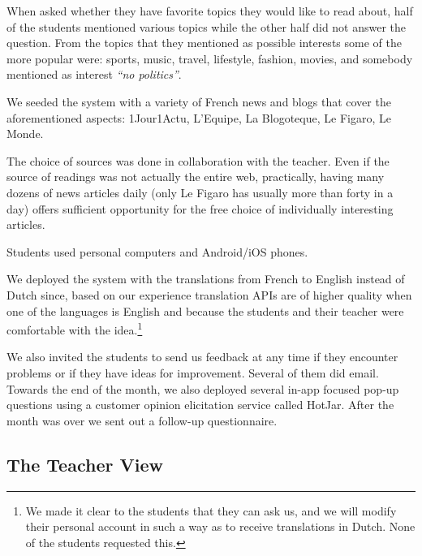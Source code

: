 When asked whether they have favorite topics they would like to read about, half of the students mentioned various topics while the other half did not answer the question. From the topics that they mentioned as possible interests some of the more popular were: sports, music, travel, lifestyle, fashion, movies, and somebody mentioned as interest {\em ``no politics''}.


We seeded the system with a variety of French news and blogs that cover the aforementioned aspects: 1Jour1Actu, L'Equipe, La Blogoteque, Le Figaro, Le Monde. 

\begin{added}
	
	The choice of sources was done in collaboration with the teacher. Even if the source of readings was not actually the entire web, practically, having many dozens of news articles daily (only Le Figaro has usually more than forty in a day) offers sufficient opportunity for the free choice of individually interesting articles. 
	
\end{added}



\begin{added}
Students used personal computers and Android/iOS phones.
\end{added}

	We deployed the system with the translations from French to English instead of Dutch since, based on our experience translation APIs are of higher quality when one of the languages is English and because the students and their teacher were comfortable with the idea.\footnote{We made it clear to the students that they can ask us, and we will modify their personal account in such a way as to receive translations in Dutch. None of the students requested this.}

We also invited the students to send us feedback at any time if they encounter problems or if they have ideas for improvement. Several of them did email. Towards the end of the month, we also deployed several in-app focused pop-up questions using a customer opinion elicitation service called HotJar. After the month was over we sent out a follow-up questionnaire.


\subsection{The Teacher View}

